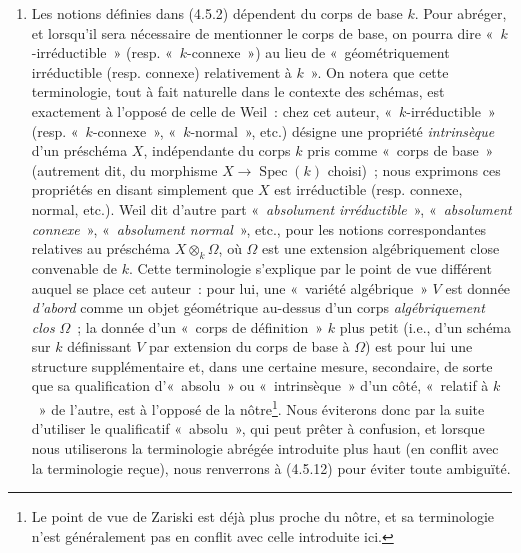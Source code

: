 \begin{remarks}[4.5.12]
\label{IV.2.4.5.12-fr}
\begin{enumerate}
\item[(i)] Les notions définies dans (4.5.2) dépendent du corps de base $k$.
Pour abréger, et lorsqu'il sera nécessaire de mentionner le corps de base, on
pourra dire «~$k$-irréductible~» (resp. «~$k$-connexe~») au lieu de
«~géométriquement irréductible (resp. connexe) relativement à $k$~». On notera
que cette terminologie, tout à fait naturelle dans le contexte des schémas,
est exactement à l'opposé de celle de Weil~: chez cet auteur,
«~$k$-irréductible~» (resp. «~$k$-connexe~», «~$k$-normal~», etc.) désigne une
propriété \emph{intrinsèque} d'un préschéma $X$, indépendante du corps $k$ pris
comme «~corps de base~» (autrement dit, du morphisme
$X\to\operatorname{Spec}(k)$ choisi)~; nous exprimons ces propriétés en disant
simplement que $X$ est irréductible (resp. connexe, normal, etc.). Weil dit
d'autre part «~\emph{absolument irréductible}~», «~\emph{absolument connexe}~», «~\emph{absolument
normal}~», etc., pour les notions correspondantes relatives au préschéma
$X\otimes_k\Omega$, où $\Omega$ est une extension algébriquement close
convenable de $k$. Cette terminologie s'explique par le point de vue différent
auquel se place cet auteur~: pour lui, une «~variété algébrique~» $V$ est
donnée \emph{d'abord} comme un objet
géométrique au-dessus d'un corps \emph{algébriquement clos} $\Omega$~; la donnée d'un
«~corps de définition~» $k$ plus petit (i.e., d'un schéma sur $k$ définissant
$V$ par extension du corps de base à $\Omega$) est pour lui une structure
supplémentaire et, dans une certaine mesure, secondaire, de sorte que sa
qualification d'«~absolu~» ou «~intrinsèque~» d'un côté, «~relatif à $k$~» de
l'autre, est à l'opposé de la nôtre\footnote{Le point de vue de Zariski est
déjà plus proche du nôtre, et sa terminologie n'est généralement pas en conflit
avec celle introduite ici.}. Nous éviterons donc par la suite d'utiliser le
qualificatif «~absolu~», qui peut prêter à confusion, et lorsque nous
utiliserons la terminologie abrégée introduite plus haut (en conflit avec la
terminologie reçue), nous renverrons à (4.5.12) pour éviter toute ambiguïté.


\end{enumerate}
\end{remarks}
